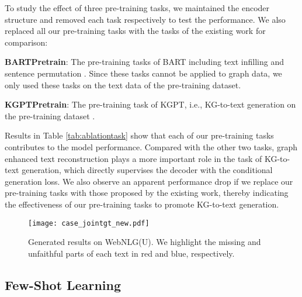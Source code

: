 \documentclass[11pt,a4paper]{article}
\begin{document}
To study the effect of three pre-training tasks, we maintained the encoder structure and removed each task respectively to test the performance. We also replaced all our pre-training tasks with the tasks of the existing work for comparison:

\noindent \textbf{BARTPretrain}: The pre-training tasks of BART including text infilling and sentence permutation \cite{lewis2020bart}. Since these tasks cannot be applied to graph data, we only used these tasks on the text data of the pre-training dataset.

\noindent \textbf{KGPTPretrain}: The pre-training task of KGPT, i.e., KG-to-text generation on the pre-training dataset \cite{chen2020kgpt}.

Results in Table \ref{tab:ablationtask} show that each of our pre-training tasks contributes to the model performance. Compared with the other two tasks, graph enhanced text reconstruction plays a more important role in the task of KG-to-text generation, which directly supervises the decoder with the conditional generation loss. We also observe an apparent performance drop if we replace our pre-training tasks with those proposed by the existing work, thereby indicating the effectiveness of our pre-training tasks to promote KG-to-text generation.


\begin{figure*}[!htp]
  \centering
  \texttt{[image: case\_jointgt\_new.pdf]}\caption{Generated results on WebNLG(U). We highlight the missing and unfaithful parts of each text in red and blue, respectively.}
  \label{fig:casestudy}
\end{figure*}



\subsection{Few-Shot Learning}

\begin{table} [!htp]
\centering
\small
{}
\caption{BLEU scores of the models with correponding pre-training tasks trained on different proportions of WebNLG(U).}
\label{tab:fewshot}
\end{table}
\end{document}
